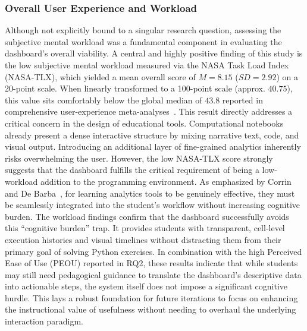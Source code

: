 \subsubsection{Overall User Experience and Workload}
Although not explicitly bound to a singular research question, assessing the subjective mental workload was a fundamental component in evaluating the dashboard's overall viability. A central and highly positive finding of this study is the low subjective mental workload measured via the NASA Task Load Index (NASA-TLX), which yielded a mean overall score of $M = 8.15$ ($SD = 2.92$) on a 20-point scale. When linearly transformed to a 100-point scale (approx. $40.75$), this value sits comfortably below the global median of $43.8$ reported in comprehensive user-experience meta-analyses~\cite{hertzum2021reference}.
This result directly addresses a critical concern in the design of educational tools. Computational notebooks already present a dense interactive structure by mixing narrative text, code, and visual output. Introducing an additional layer of fine-grained analytics inherently risks overwhelming the user. However, the low NASA-TLX score strongly suggests that the dashboard fulfills the critical requirement of being a low-workload addition to the programming environment. As emphasized by Corrin and De Barba~\cite{corrin2014exploring}, for learning analytics tools to be genuinely effective, they must be seamlessly integrated into the student's workflow without increasing cognitive burden.
The workload findings confirm that the dashboard successfully avoids this ``cognitive burden'' trap. It provides students with transparent, cell-level execution histories and visual timelines without distracting them from their primary goal of solving Python exercises. In combination with the high Perceived Ease of Use (PEOU) reported in RQ2, these results indicate that while students may still need pedagogical guidance to translate the dashboard's descriptive data into actionable steps, the system itself does not impose a significant cognitive hurdle. This lays a robust foundation for future iterations to focus on enhancing the instructional value of usefulness without needing to overhaul the underlying interaction paradigm.

